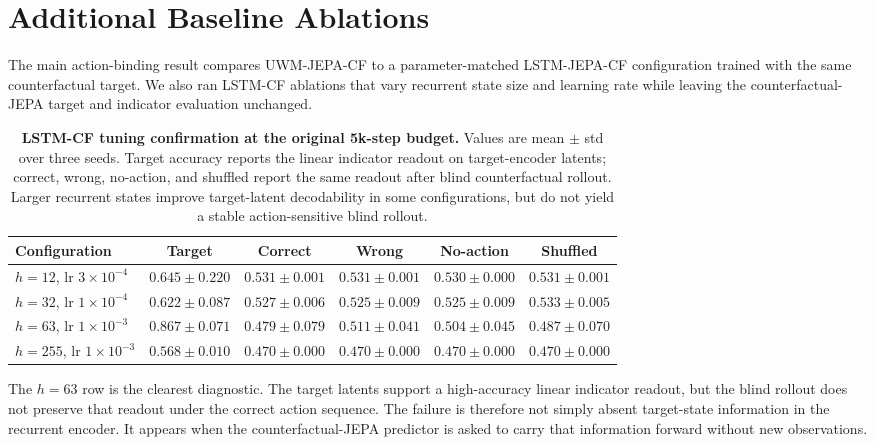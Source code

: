 \section{Additional Baseline Ablations}
\label{sec:baseline-ablations}

The main action-binding result compares UWM-JEPA-CF to a
parameter-matched LSTM-JEPA-CF configuration trained with the same
counterfactual target. We also ran LSTM-CF ablations that vary
recurrent state size and learning rate while leaving the
counterfactual-JEPA target and indicator evaluation unchanged.

\begin{table}[h]
\centering
\small
\caption{\textbf{LSTM-CF tuning confirmation at the original 5k-step
budget.} Values are mean $\pm$ std over three seeds. Target accuracy
reports the linear indicator readout on target-encoder latents; correct,
wrong, no-action, and shuffled report the same readout after blind
counterfactual rollout. Larger recurrent states improve target-latent
decodability in some configurations, but do not yield a stable
action-sensitive blind rollout.}
\label{tab:lstm-cf-confirm}
\begin{tabular}{lccccc}
\toprule
Configuration & Target & Correct & Wrong & No-action & Shuffled \\
\midrule
$h{=}12$, lr $3{\times}10^{-4}$ &
$0.645\pm0.220$ & $0.531\pm0.001$ & $0.531\pm0.001$ &
$0.530\pm0.000$ & $0.531\pm0.001$ \\
$h{=}32$, lr $1{\times}10^{-4}$ &
$0.622\pm0.087$ & $0.527\pm0.006$ & $0.525\pm0.009$ &
$0.525\pm0.009$ & $0.533\pm0.005$ \\
$h{=}63$, lr $1{\times}10^{-3}$ &
$0.867\pm0.071$ & $0.479\pm0.079$ & $0.511\pm0.041$ &
$0.504\pm0.045$ & $0.487\pm0.070$ \\
$h{=}255$, lr $1{\times}10^{-3}$ &
$0.568\pm0.010$ & $0.470\pm0.000$ & $0.470\pm0.000$ &
$0.470\pm0.000$ & $0.470\pm0.000$ \\
\bottomrule
\end{tabular}
\end{table}

The $h{=}63$ row is the clearest diagnostic. The target latents support
a high-accuracy linear indicator readout, but the blind rollout does
not preserve that readout under the correct action sequence. The
failure is therefore not simply absent target-state information in the
recurrent encoder. It appears when the counterfactual-JEPA predictor is
asked to carry that information forward without new observations.


